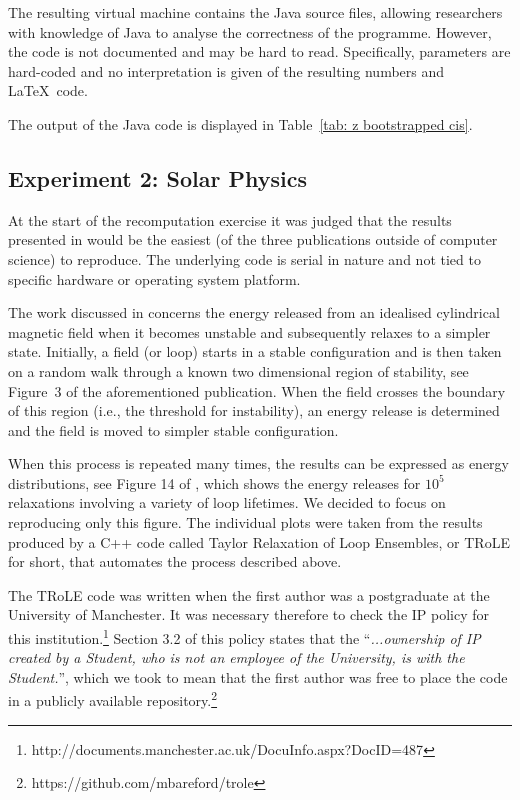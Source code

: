 The resulting virtual machine contains the Java source files, allowing researchers with knowledge of Java to analyse the correctness of the programme. However, the code is not documented and may be hard to read. Specifically, parameters are hard-coded and no interpretation is given of the resulting numbers and \LaTeX\ code.

The output of the Java code is displayed in Table~\ref{tab: z bootstrapped cis}.



\subsection*{Experiment 2: Solar Physics}

At the start of the recomputation exercise it was judged that the results presented in \cite{bareford2010nanoflare} would be the easiest (of the three publications outside of computer science) to reproduce. The underlying code is serial in nature and not tied to specific hardware or operating system platform. 

The work discussed in \cite{bareford2010nanoflare} concerns the energy released from an idealised cylindrical magnetic field when it becomes unstable and subsequently relaxes to a simpler state. Initially, a field (or loop) starts in a stable configuration and is then taken on a random walk through a known two dimensional region of stability, see \mbox{Figure 3} of the aforementioned publication. When the field crosses the boundary of this region (i.e., the threshold for instability), an energy release is determined and the field is moved to simpler stable configuration. 

When this process is repeated many times, the results can be expressed as energy distributions, see Figure 14 of \cite{bareford2010nanoflare}, which shows the energy releases for $10^5$ relaxations involving a variety of loop lifetimes. We decided to focus on reproducing only this figure. The individual plots were taken from the results produced by a C++ code called Taylor Relaxation of Loop Ensembles, or TRoLE for short, that automates the process described above.

The TRoLE code was written when the first author \cite{bareford2010nanoflare} was a postgraduate at the University of Manchester. It was necessary therefore to check the IP policy for this institution.\footnote{http://documents.manchester.ac.uk/DocuInfo.aspx?DocID=487} Section 3.2 of this policy states that the ``\emph{...ownership of IP created by a Student, who is not an employee of the University, is with the Student.}'', which we took to mean that the first author was free to place the code in a publicly available repository.\footnote{https://github.com/mbareford/trole}

